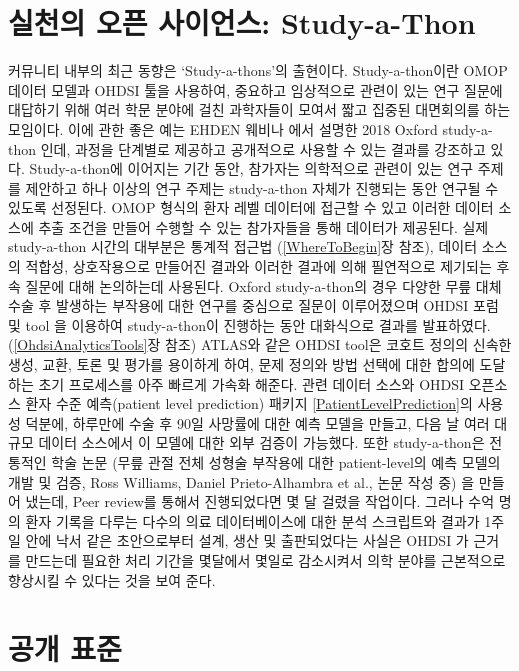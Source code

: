 \documentclass[11pt]{book}
\theoremstyle{definition}
\theoremstyle{definition}
\theoremstyle{definition}
\theoremstyle{remark}
\begin{document}
\section{실천의 오픈 사이언스: Study-a-Thon}\label{---study-a-thon}


커뮤니티 내부의 최근 동향은 `Study-a-thons'의 출현이다. Study-a-thon이란
OMOP 데이터 모델과 OHDSI 툴을 사용하여, 중요하고 임상적으로 관련이 있는
연구 질문에 대답하기 위해 여러 학문 분야에 걸친 과학자들이 모여서 짧고
집중된 대면회의를 하는 모임이다. 이에 관한 좋은 예는 EHDEN 웨비나 에서
설명한 2018 Oxford study-a-thon 인데, 과정을 단계별로 제공하고
공개적으로 사용할 수 있는 결과를 강조하고 있다. Study-a-thon에 이어지는
기간 동안, 참가자는 의학적으로 관련이 있는 연구 주제를 제안하고 하나
이상의 연구 주제는 study-a-thon 자체가 진행되는 동안 연구될 수 있도록
선정된다. OMOP 형식의 환자 레벨 데이터에 접근할 수 있고 이러한 데이터
소스에 추출 조건을 만들어 수행할 수 있는 참가자들을 통해 데이터가
제공된다. 실제 study-a-thon 시간의 대부분은 통계적 접근법
(\ref{WhereToBegin}장 참조), 데이터 소스의 적합성, 상호작용으로 만들어진
결과와 이러한 결과에 의해 필연적으로 제기되는 후속 질문에 대해
논의하는데 사용된다. Oxford study-a-thon의 경우 다양한 무릎 대체 수술 후
발생하는 부작용에 대한 연구를 중심으로 질문이 이루어졌으며 OHDSI 포럼 및
tool 을 이용하여 study-a-thon이 진행하는 동안 대화식으로 결과를
발표하였다. (\ref{OhdsiAnalyticsTools}장 참조) ATLAS와 같은 OHDSI tool은
코호트 정의의 신속한 생성, 교환, 토론 및 평가를 용이하게 하여, 문제
정의와 방법 선택에 대한 합의에 도달하는 초기 프로세스를 아주 빠르게
가속화 해준다. 관련 데이터 소스와 OHDSI 오픈소스 환자 수준 예측(patient
level prediction) 패키지 \ref{PatientLevelPrediction}의 사용성 덕분에,
하루만에 수술 후 90일 사망률에 대한 예측 모델을 만들고, 다음 날 여러
대규모 데이터 소스에서 이 모델에 대한 외부 검증이 가능했다. 또한
study-a-thon은 전통적인 학술 논문 (무릎 관절 전체 성형술 부작용에 대한
patient-level의 예측 모델의 개발 및 검증, Ross Williams, Daniel
Prieto-Alhambra et al., 논문 작성 중) 을 만들어 냈는데, Peer review를
통해서 진행되었다면 몇 달 걸렸을 작업이다. 그러나 수억 명의 환자 기록을
다루는 다수의 의료 데이터베이스에 대한 분석 스크립트와 결과가 1주일 안에
낙서 같은 초안으로부터 설계, 생산 및 출판되었다는 사실은 OHDSI 가 근거를
만드는데 필요한 처리 기간을 몇달에서 몇일로 감소시켜서 의학 분야를
근본적으로 향상시킬 수 있다는 것을 보여 준다.

\section{공개 표준}\label{-}
\end{document}
